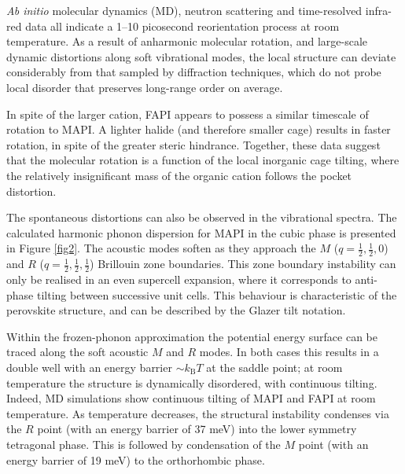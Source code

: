 \emph{Ab initio} molecular dynamics (MD), neutron scattering\autocite{Leguy2015b,Chen2015s} and time-resolved infra-red\autocite{Bakulin2015a} data all indicate a 1--10 picosecond reorientation process at room temperature.
As a result of anharmonic molecular rotation, and large-scale dynamic distortions along soft 
vibrational modes, the local structure can deviate considerably from that sampled by diffraction techniques, which do not probe local disorder that preserves long-range order on average.

In spite of the larger cation, FAPI appears to possess a similar timescale of rotation to MAPI\autocite{Weller2015b}. 
A lighter halide (and therefore smaller cage) results in faster rotation, in spite of the greater steric hindrance.\autocite{selig2017organic}
Together, these data suggest that the molecular rotation is a function of the local inorganic cage tilting, where the relatively insignificant mass of the organic cation follows the pocket distortion. 

The spontaneous distortions can also be observed in the vibrational spectra.
The calculated harmonic phonon dispersion for MAPI in the cubic phase is presented in Figure \ref{fig2}.
The acoustic modes soften as they approach the $M$ ($q = \frac{1}{2}, \frac{1}{2}, 0$) and $R$ ($q = \frac{1}{2}, \frac{1}{2}, \frac{1}{2}$) Brillouin zone boundaries. 
This zone boundary instability can only be realised in an even supercell expansion, where it corresponds to anti-phase tilting between successive unit cells.
This behaviour is characteristic of the perovskite structure,\autocite{Yang2017} and can be described by the Glazer tilt notation.\autocite{Glazer1972,Woodward1997} 

Within the frozen-phonon approximation the potential energy surface can be traced along the soft acoustic $M$ and $R$ modes. 
In both cases this results in a double well with an energy barrier $\sim k_\mathrm{B}T$ at the saddle point;\autocite{Whalley2016}   
at room temperature the structure is dynamically disordered, with continuous tilting.
Indeed, MD simulations show continuous tilting of MAPI and FAPI at room temperature.\autocite{Frost2014,Quarti2015a,Weller2015b}
%
As temperature decreases, the structural instability condenses via the $R$ point (with an energy barrier of 37 meV) into the lower symmetry tetragonal phase. 
This is followed by condensation of the $M$ point (with an energy barrier of 19 meV) to the orthorhombic phase.\autocite{Whalley2016}

